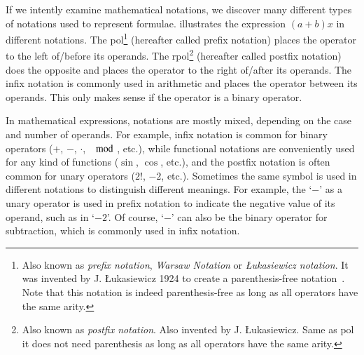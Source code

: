 \documentclass[a4paper,11pt]{article}
\theoremstyle{defTheoStyle}
\theoremstyle{defExampStyle}
\begin{document}
	If we intently examine mathematical notations, we discover many different types of notations used to represent formulae.  illustrates the expression $(a+b)x$ in different notations. The \gls*{pol}\footnote{Also known as \textit{prefix notation}, \textit{Warsaw Notation} or \textit{{\L}ukasiewicz notation}. It was invented by J. {\L}ukasiewicz 1924 to create a parenthesis-free notation~\parencite{Hamblin1962}. Note that this notation is indeed parenthesis-free as long as all operators have the same arity.} (hereafter called prefix notation) places the operator to the left of/before its operands. The \gls*{rpol}\footnote{Also known as \textit{postfix notation}. Also invented by J. {\L}ukasiewicz. Same as \gls*{pol} it does not need parenthesis as long as all operators have the same arity.} (hereafter called postfix notation) does the opposite and places the operator to the right of/after its operands. The infix notation is commonly used in arithmetic and places the operator between its operands. This only makes sense if the operator is a binary operator.
	
	In mathematical expressions, notations are mostly mixed, depending on the case and number of operands. For example, infix notation is common for binary operators ($+$, $-$, $\cdot$, $\mod$, etc.), while functional notations are conveniently used for any kind of functions ($\sin$, $\cos$, etc.), and the postfix notation is often common for unary operators ($2!$, $-2$, etc.). Sometimes the same symbol is used in different notations to distinguish different meanings. For example, the `$-$' as a unary operator is used in prefix notation to indicate the negative value of its operand, such as in `$-2$'. Of course, `$-$' can also be the binary operator for subtraction, which is commonly used in infix notation. 
	
\end{document}
